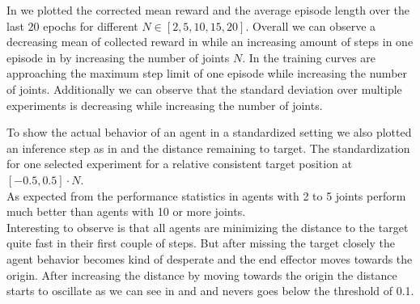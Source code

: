 In  we plotted the corrected mean reward and the average episode length over the last 20 epochs for different $N \in [2, 5, 10, 15, 20]$. Overall we can observe a decreasing mean of collected reward in  while an increasing amount of steps in one episode in  by increasing the number of joints $N$. In  the training curves are approaching the maximum step limit of one episode while increasing the number of joints. Additionally we can observe that the standard deviation over multiple experiments is decreasing while increasing the number of joints.

To show the actual behavior of an agent in a standardized setting we also plotted an inference step as in  and the distance remaining to target. The standardization  for one selected experiment for a relative consistent target position at $[-0.5, 0.5] \cdot N$. \\
As expected from the performance statistics in  agents with 2 to 5 joints perform much better than agents with 10 or more joints. \\
Interesting to observe is that all agents are minimizing the distance to the target quite fast in their first couple of steps. But after missing the target closely the agent behavior becomes kind of desperate and the end effector moves towards the origin. After increasing the distance by moving towards the origin the distance starts to oscillate as we can see in  and  and nevers goes below the threshold of 0.1. 
